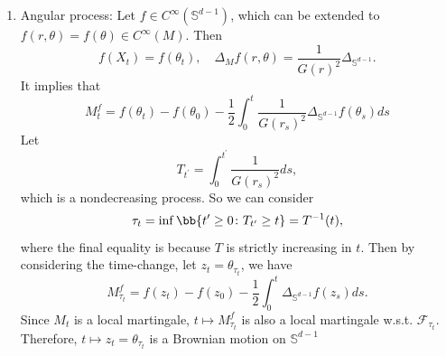 \begin{exam}
\begin{enumerate}[label=(\arabic{*})]
        \item Angular process: Let $f \in C^\infty(\mathbb{S}^{d-1})$, which can be extended to $f(r,\theta) = f(\theta) \in C^\infty(M)$. Then
        \begin{equation*}
            f(X_t) = f(\theta_t),\quad \Delta_M f(r,\theta) = \frac{1}{G(r)^2}\Delta_{\mathbb{S}^{d-1}}.
        \end{equation*}
        It implies that
        \begin{equation*}
            M^f_t = f(\theta_t) - f(\theta_0) - \frac{1}{2}\int_0^t \frac{1}{G(r_s)^2}\Delta_{\mathbb{S}^{d-1}}f(\theta_s) ds
        \end{equation*}
        Let
        \begin{equation*}
            T_{t^\prime} = \int_0^{t^\prime} \frac{1}{G(r_s)^2}ds,
        \end{equation*}
        which is a nondecreasing process. So we can consider
        \begin{equation*}
            \tau_t = \inf\bb{t^\prime \geq 0 \colon T_{t^\prime} \geq t} =T^{-1}(t),
        \end{equation*}
        where the final equality is because $T$ is strictly increasing in $t$. Then by considering the time-change, let $z_t = \theta_{\tau_t}$, we have
        \begin{equation*}
            M^f_{\tau_t} = f(z_t) - f(z_0) - \frac{1}{2}\int_0^t \Delta_{\mathbb{S}^{d-1}}f(z_s) ds.
        \end{equation*}
        Since $M_t$ is a local martingale, $t \mapsto M^f_{\tau_t}$ is also a local martingale w.s.t. $\mathcal{F}_{\tau_t}$. Therefore, $t \mapsto z_t = \theta_{\tau_t}$ is a Brownian motion on $\mathbb{S}^{d-1}$
    \end{enumerate}


\end{exam}
